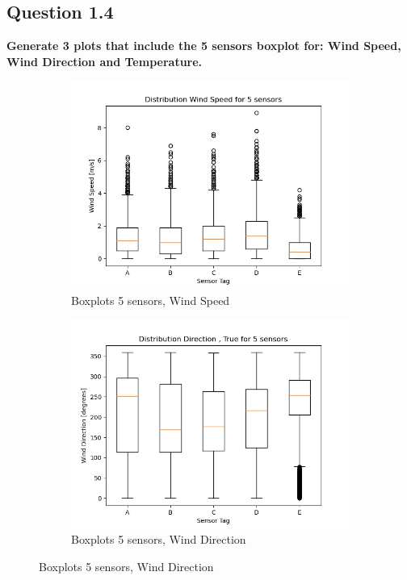 \documentclass{report}
\begin{document}
	
	\subsection{Question 1.4}
	\textbf{Generate 3 plots that include the 5 sensors boxplot for: Wind Speed, Wind Direction and Temperature.}
	
	
	\begin{figure}[H]
		\centering
		\begin{subfigure}[b]{0.7\linewidth}
			\includegraphics[width=\linewidth]{GEO1001_hw01_images/GEO1001_hw01_A1_box_wind.png}
			\caption{Boxplots 5 sensors, Wind Speed}
			\label{fig:boxwind}
		\end{subfigure}
	
		\begin{subfigure}[b]{0.7\linewidth}
			\includegraphics[width=\linewidth]{GEO1001_hw01_images/GEO1001_hw01_A1_box_direction.png}
			\caption{Boxplots 5 sensors, Wind Direction}
			\label{fig:boxdir}
		\end{subfigure}
		

\end{figure}
\end{document}

